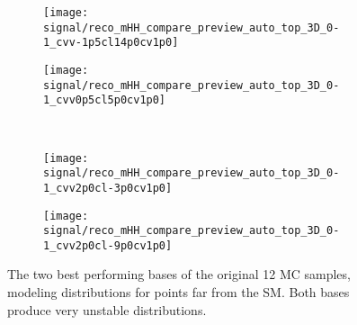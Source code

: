     \begin{figure}[tbh]
    	\centering
        \begin{subfigure}{0.44\textwidth}
            \texttt{[image: signal/reco\_mHH\_compare\_preview\_auto\_top\_3D\_0-1\_cvv-1p5cl14p0cv1p0]}
            \captionsetup{justification=centering} \caption{}
        \end{subfigure}
        \begin{subfigure}{0.44\textwidth}
            \texttt{[image: signal/reco\_mHH\_compare\_preview\_auto\_top\_3D\_0-1\_cvv0p5cl5p0cv1p0]}
            \captionsetup{justification=centering} \caption{}
        \end{subfigure}\\
        \begin{subfigure}{0.44\textwidth}
            \texttt{[image: signal/reco\_mHH\_compare\_preview\_auto\_top\_3D\_0-1\_cvv2p0cl-3p0cv1p0]}
            \captionsetup{justification=centering} \caption{}
        \end{subfigure}
        \begin{subfigure}{0.44\textwidth}
            \texttt{[image: signal/reco\_mHH\_compare\_preview\_auto\_top\_3D\_0-1\_cvv2p0cl-9p0cv1p0]}
            \captionsetup{justification=centering} \caption{}
        \end{subfigure}
        \caption{
            The two best performing bases of the original 12 MC samples,
                modeling \mhh distributions for points far from the SM.
            Both bases produce very unstable distributions.
        }
        \label{fig:mcpreviews_old}
    \end{figure}


